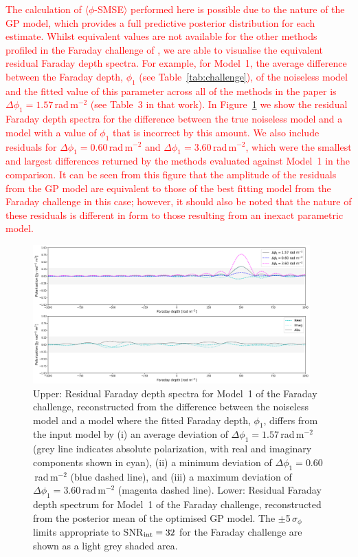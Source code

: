 \documentclass[fleqn,usenatbib]{mnras}
\begin{document}
\textcolor{red}{The calculation of $\langle \phi$-SMSE$\rangle$ performed here is possible due to the nature of the GP model, which provides a full predictive posterior distribution for each estimate. Whilst equivalent values are not available for the other methods profiled in the Faraday challenge of \cite{Sun_2015}, we are able to visualise the equivalent residual Faraday depth spectra. For example, for Model~1, the average difference between the Faraday depth, $\phi_1$ (see Table~\ref{tab:challenge}), of the noiseless model and the fitted value of this parameter across all of the methods in the \cite{Sun_2015} paper is $\Delta \phi_1 = 1.57$\,rad\,m$^{-2}$ (see Table~3 in that work). In Figure~\ref{fig:residuals} we show the residual Faraday depth spectra for the difference between the true noiseless model and a model with a value of $\phi_1$ that is incorrect by this amount. We also include residuals for $\Delta \phi_1 = 0.60$\,rad\,m$^{-2}$ and $\Delta \phi_1 = 3.60$\,rad\,m$^{-2}$, which were the smallest and largest differences returned by the methods evaluated against Model~1 in the \cite{Sun_2015} comparison. It can be seen from this figure that the amplitude of the residuals from the GP model are equivalent to those of the best fitting model from the \cite{Sun_2015} Faraday challenge in this case; however, it should also be noted that the nature of these residuals is different in form to those resulting from an inexact parametric model.}
%
\begin{figure}
\includegraphics[width=0.95\textwidth]{./FIGURES/residuals.png}
\caption{Upper: Residual Faraday depth spectra for Model~1 of the Faraday challenge, reconstructed from the difference between the noiseless model and a model where the fitted Faraday depth, $\phi_1$, differs from the input model by (i) an average deviation of $\Delta \phi_1 = 1.57$\,rad\,m$^{-2}$ (grey line indicates absolute polarization, with real and imaginary components shown in cyan), (ii) a minimum deviation of $\Delta \phi_1 = 0.60$\,rad\,m$^{-2}$ (blue dashed line), and (iii) a maximum deviation of $\Delta \phi_1 = 3.60$\,rad\,m$^{-2}$ (magenta dashed line). Lower: Residual Faraday depth spectrum for Model~1 of the Faraday challenge, reconstructed from the posterior mean of the optimised GP model. The $\pm$5\,$\sigma_{\phi}$ limits appropriate to SNR$_{\rm int}=32$ for the Faraday challenge are shown as a light grey shaded area. \label{fig:residuals}}
\end{figure}
\end{document}
